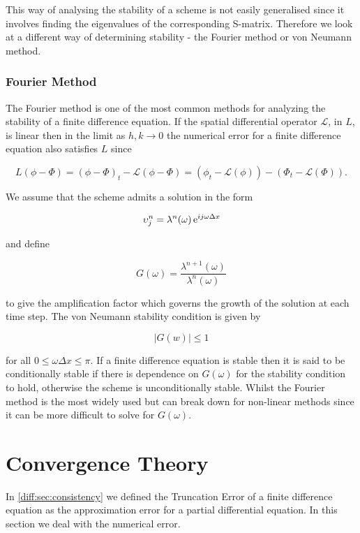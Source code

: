 \documentclass[../main.tex]{subfiles}
\begin{document}
  This way of analysing the stability of a scheme is not easily generalised since it involves finding the eigenvalues of the corresponding S-matrix. Therefore we look at a different way of determining stability - the Fourier method or von Neumann method.


  \subsubsection{Fourier Method}
  The Fourier method is one of the most common methods for analyzing the stability of a finite difference equation. If the spatial differential operator $\mathcal{L}$, in $L$, is linear then in the limit as $h, k \to 0$ the numerical error for a finite difference equation also satisfies $L$ since

  $$
    L(\phi - \Phi) = (\phi - \Phi)_t - \mathcal{L}(\phi - \Phi) = (\phi_t - \mathcal{L}(\phi)) - (\Phi_t - \mathcal{L}(\Phi)).
  $$

  We assume that the scheme admits a solution in the form

  \begin{equation}
    \upsilon^n_j = \lambda^n(\omega) \operatorname{e}^{i j \omega \Delta x}
  \end{equation}

  and define

  \begin{equation}
    G(\omega) = \frac{\lambda^{n+1}(\omega)}{\lambda^n(\omega)}
  \end{equation}

  to give the amplification factor which governs the growth of the solution at each time step. The von Neumann stability condition is given by

  \begin{equation}
    \left\vert G(w) \right\vert \leq 1
  \end{equation}

  for all $0 \leq \omega \Delta x \leq \pi$. If a finite difference equation is stable then it is said to be conditionally stable if there is dependence on $G(\omega)$ for the stability condition to hold, otherwise the scheme is unconditionally stable. Whilst the Fourier method is the most widely used but can break down for non-linear methods since it can be more difficult to solve for $G(\omega)$.

  \section{Convergence Theory}
  In \autoref{diff:sec:consistency} we defined the Truncation Error of a finite difference equation as the approximation error for a partial differential equation. In this section we deal with the numerical error.
\end{document}
